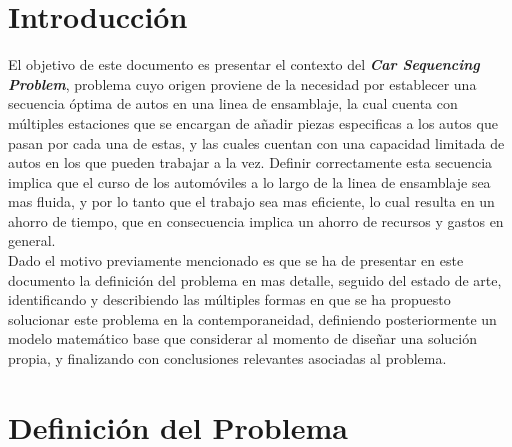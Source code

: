 \documentclass[letter, 10pt]{article}
\begin{document}
\section{Introducción}
El objetivo de este documento es presentar el contexto del  \textit{\textbf{Car Sequencing Problem}}, problema cuyo origen proviene de la necesidad por establecer una secuencia óptima de autos en una linea de ensamblaje, la cual cuenta con múltiples estaciones que se encargan de añadir piezas especificas a los autos que pasan por cada una de estas, y las cuales cuentan con una capacidad limitada de autos en los que pueden trabajar a la vez. Definir correctamente esta secuencia implica que el curso de los automóviles a lo largo de la linea de ensamblaje sea mas fluida, y por lo tanto que el trabajo sea mas eficiente, lo cual resulta en un ahorro de tiempo, que en consecuencia implica un ahorro de recursos y gastos en general.\\
Dado el motivo previamente mencionado es que se ha de presentar en este documento la definición del problema en mas detalle, seguido del estado de arte, identificando y describiendo las múltiples formas en que se ha propuesto solucionar este problema en la contemporaneidad, definiendo posteriormente un modelo matemático base que considerar al momento de diseñar una solución propia, y finalizando con conclusiones relevantes asociadas al problema.



\section{Definición del Problema}
\end{document}
